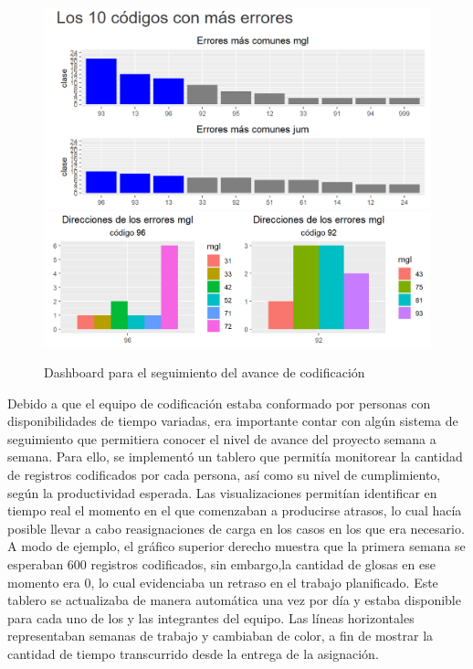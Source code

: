 \documentclass[
  12pt,
  spanish,
]{article}
\begin{document}
\begin{figure}[H]
\centering
\large
\caption{Dashboard para el seguimiento del avance de codificación}
\label{ciuo_distancia}
\includegraphics[width = \linewidth]{imagenes/resumen_errores.png}
\includegraphics[width = \linewidth]{imagenes/direccion_errores.png}
\normalsize
\end{figure}

Debido a que el equipo de codificación estaba conformado por personas
con disponibilidades de tiempo variadas, era importante contar con algún
sistema de seguimiento que permitiera conocer el nivel de avance del
proyecto semana a semana. Para ello, se implementó un tablero que
permitía monitorear la cantidad de registros codificados por cada
persona, así como su nivel de cumplimiento, según la productividad
esperada. Las visualizaciones permitían identificar en tiempo real el
momento en el que comenzaban a producirse atrasos, lo cual hacía posible
llevar a cabo reasignaciones de carga en los casos en los que era
necesario. A modo de ejemplo, el gráfico superior derecho muestra que la
primera semana se esperaban 600 registros codificados, sin embargo,la
cantidad de glosas en ese momento era 0, lo cual evidenciaba un retraso
en el trabajo planificado. Este tablero se actualizaba de manera
automática una vez por día y estaba disponible para cada uno de los y
las integrantes del equipo. Las líneas horizontales representaban
semanas de trabajo y cambiaban de color, a fin de mostrar la cantidad de
tiempo transcurrido desde la entrega de la asignación.
\end{document}
